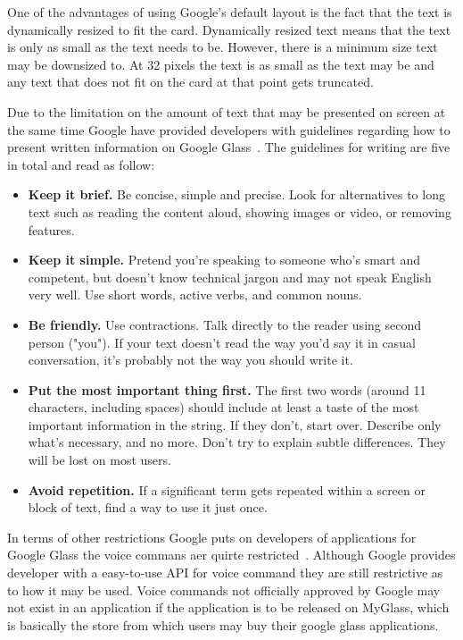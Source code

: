 One of the advantages of using Google's default layout is the fact that the text is dynamically resized to fit the card. Dynamically resized text means that the text is only as small as the text needs to be. However, there is a minimum size text may be downsized to. At 32 pixels the text is as small as the text may be and any text that does not fit on the card at that point gets truncated.

Due to the limitation on the amount of text that may be presented on screen at the same time Google have provided developers with guidelines regarding how to present written information on Google Glass~\cite{glassDesignStyle}. The guidelines for writing are five in total and read as follow:

\begin{itemize}
	\item \textbf{Keep it brief.} Be concise, simple and precise. Look for alternatives to long text such as reading the content aloud, showing images or video, or removing features.
	\item \textbf{Keep it simple.} Pretend you're speaking to someone who's smart and competent, but doesn't know technical jargon and may not speak English very well. Use short words, active verbs, and common nouns.
	\item \textbf{Be friendly.} Use contractions. Talk directly to the reader using second person ("you"). If your text doesn't read the way you'd say it in casual conversation, it's probably not the way you should write it.
	\item \textbf{Put the most important thing first.} The first two words (around 11 characters, including spaces) should include at least a taste of the most important information in the string. If they don't, start over. Describe only what's necessary, and no more. Don't try to explain subtle differences. They will be lost on most users.
	\item \textbf{Avoid repetition.} If a significant term gets repeated within a screen or block of text, find a way to use it just once.
\end{itemize}

In terms of other restrictions Google puts on developers of applications for Google Glass the voice commans aer quirte restricted~\cite{googleGlassVoiceCommand}. Although Google provides developer with a easy-to-use API for voice command they are still restrictive as to how it may be used. Voice commands not officially approved by Google may not exist in an application if the application is to be released on MyGlass, which is basically the store from which users may buy their google glass applications.

